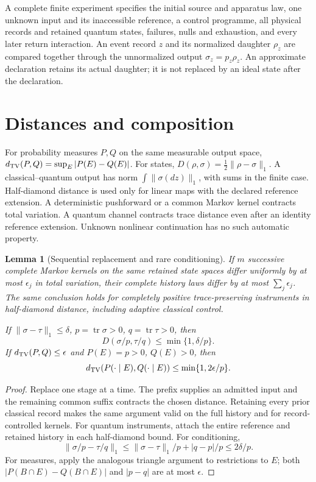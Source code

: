 \documentclass[11pt,oneside,openany]{book}
\newtheorem{lemma}[theorem]{Lemma}
\theoremstyle{definition}
\theoremstyle{remark}\newtheorem{remark}[theorem]{Remark}
\begin{document}
A complete finite experiment specifies the initial source and apparatus law, one unknown input and its inaccessible reference, a control programme, all physical records and retained quantum states, failures, nulls and exhaustion, and every later return interaction. An event record $z$ and its normalized daughter $\rho_z$ are compared together through the unnormalized output $\sigma_z=p_z\rho_z$. An approximate declaration retains its actual daughter; it is not replaced by an ideal state after the declaration.

\section{Distances and composition}
For probability measures $P,Q$ on the same measurable output space, $d_{\rm TV}(P,Q)=\sup_E|P(E)-Q(E)|$. For states, $D(\rho,\sigma)=\frac12\|\rho-\sigma\|_1$. A classical--quantum output has norm $\int\|\sigma(dz)\|_1$, with sums in the finite case. Half-diamond distance is used only for linear maps with the declared reference extension. A deterministic pushforward or a common Markov kernel contracts total variation. A quantum channel contracts trace distance even after an identity reference extension. Unknown nonlinear continuation has no such automatic property.

\begin{lemma}[Sequential replacement and rare conditioning]\label{found:errors}
If $m$ successive complete Markov kernels on the same retained state spaces differ uniformly by at most $\epsilon_j$ in total variation, their complete history laws differ by at most $\sum_j\epsilon_j$. The same conclusion holds for completely positive trace-preserving instruments in half-diamond distance, including adaptive classical control.

If $\|\sigma-\tau\|_1\le\delta$, $p=\operatorname{tr}\sigma>0$, $q=\operatorname{tr}\tau>0$, then
\[
 D(\sigma/p,\tau/q)\le\min\{1,\delta/p\}.
\]
If $d_{\rm TV}(P,Q)\le\epsilon$ and $P(E)=p>0$, $Q(E)>0$, then
\[
 d_{\rm TV}(P(\cdot\mid E),Q(\cdot\mid E))\le\min\{1,2\epsilon/p\}.
\]
\end{lemma}
\begin{proof}
Replace one stage at a time. The prefix supplies an admitted input and the remaining common suffix contracts the chosen distance. Retaining every prior classical record makes the same argument valid on the full history and for record-controlled kernels. For quantum instruments, attach the entire reference and retained history in each half-diamond bound. For conditioning,
\[
 \|\sigma/p-\tau/q\|_1\le\|\sigma-\tau\|_1/p+|q-p|/p\le2\delta/p.
\]
For measures, apply the analogous triangle argument to restrictions to $E$; both $|P(B\cap E)-Q(B\cap E)|$ and $|p-q|$ are at most $\epsilon$.
\end{proof}
\end{document}
